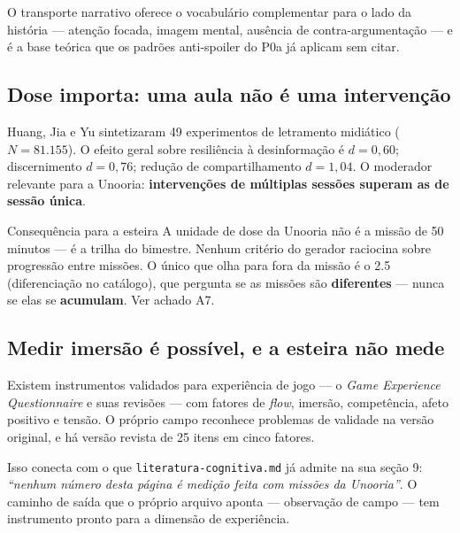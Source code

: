 \documentclass[11pt,a4paper]{article}
\begin{document}
O transporte narrativo \cite{green2000, vanlaer2014} oferece o vocabul\'ario complementar para o
lado da hist\'oria --- aten\c{c}\~ao focada, imagem mental, aus\^encia de contra-argumenta\c{c}\~ao
--- e \'e a base te\'orica que os padr\~oes anti-spoiler do P0a j\'a aplicam sem citar.

\subsection{Dose importa: uma aula n\~ao \'e uma interven\c{c}\~ao}
\label{sec:dose}

Huang, Jia e Yu \cite{huang2024} sintetizaram 49 experimentos de letramento midi\'atico
($N = 81.155$). O efeito geral sobre resili\^encia \`a desinforma\c{c}\~ao \'e $d = 0{,}60$;
discernimento $d = 0{,}76$; redu\c{c}\~ao de compartilhamento $d = 1{,}04$. O moderador relevante
para a Unooria: \textbf{interven\c{c}\~oes de m\'ultiplas sess\~oes superam as de sess\~ao
\'unica}.

\begin{notabox}{Consequ\^encia para a esteira}
A unidade de dose da Unooria n\~ao \'e a miss\~ao de 50 minutos --- \'e a trilha do bimestre.
Nenhum crit\'erio do gerador raciocina sobre progress\~ao entre miss\~oes. O \'unico que olha para
fora da miss\~ao \'e o 2.5 (diferencia\c{c}\~ao no cat\'alogo), que pergunta se as miss\~oes s\~ao
\textbf{diferentes} --- nunca se elas se \textbf{acumulam}. Ver achado A7.
\end{notabox}

\subsection{Medir imers\~ao \'e poss\'ivel, e a esteira n\~ao mede}

Existem instrumentos validados para experi\^encia de jogo --- o \emph{Game Experience
Questionnaire} e suas revis\~oes \cite{law2018} --- com fatores de \emph{flow}, imers\~ao,
compet\^encia, afeto positivo e tens\~ao. O pr\'oprio campo reconhece problemas de validade na
vers\~ao original, e h\'a vers\~ao revista de 25 itens em cinco fatores.

Isso conecta com o que \texttt{literatura-cognitiva.md} j\'a admite na sua se\c{c}\~ao 9:
\emph{``nenhum n\'umero desta p\'agina \'e medi\c{c}\~ao feita com miss\~oes da Unooria''}. O
caminho de sa\'ida que o pr\'oprio arquivo aponta --- observa\c{c}\~ao de campo --- tem
instrumento pronto para a dimens\~ao de experi\^encia.
\end{document}

